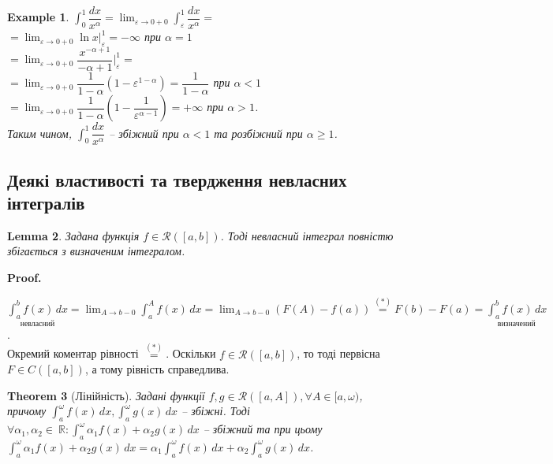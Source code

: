 \documentclass[a4paper, 10pt]{article}
\makeatletter
\def\huge{\displaystyle}
\theoremstyle{theoremdd}
\newtheorem{theorem}{Theorem}[subsection]
\theoremstyle{theoremdd}
\theoremstyle{theoremdd}
\theoremstyle{theoremdd}
\theoremstyle{theoremdd}
\newtheorem{example}[theorem]{Example}
\theoremstyle{theoremdd}
\theoremstyle{theoremdd}
\theoremstyle{theoremdd}
\newtheorem{lemma}[theorem]{Lemma}
\theoremstyle{theoremdd}
\renewenvironment{proof}[1][Proof.\\]{\par
\pushQED{\hfill \qed}%
\normalfont \topsep6\p@\@plus6\p@\relax
\trivlist
\item\relax
{\bfseries
#1\@addpunct{.}}\hspace\labelsep\ignorespaces
}{%
\popQED\endtrivlist\@endpefalse
}
\makeatother
\begin{document}
\begin{example}
$\huge\int_0^1 \dfrac{dx}{x^{\alpha}} = \lim_{\varepsilon \to 0+0} \int_\varepsilon^1 \dfrac{dx}{x^{\alpha}} \boxed{=}$\\
$= \huge\lim_{\varepsilon \to 0+0} \ln x \Big|_\varepsilon^1 = -\infty$ при $\alpha = 1$\\
$= \huge\lim_{\varepsilon \to 0+0} \dfrac{x^{-\alpha+1}}{-\alpha+1} \Big|_\varepsilon^1 =$\\
$=\huge\lim_{\varepsilon \to 0+0} \dfrac{1}{1-\alpha} \left( 1 - \varepsilon^{1-\alpha} \right) = \dfrac{1}{1-\alpha}$ при $\alpha < 1$\\
$=\huge\lim_{\varepsilon \to 0+0} \dfrac{1}{1-\alpha} \left( 1 - \dfrac{1}{\varepsilon^{\alpha-1}} \right) = +\infty$ при $\alpha > 1$.\\
Таким чином, $\huge\int_0^1 \dfrac{dx}{x^\alpha}$ -- збіжний при $\alpha < 1$ та розбіжний при $\alpha \geq 1$.
\end{example}

\subsection{Деякі властивості та твердження невласних інтегралів}
\begin{lemma}
Задана функція $f \in \mathcal{R}([a,b])$. Тоді невласний інтеграл повністю збігається з визначеним інтегралом.
\end{lemma}

\begin{proof}
$\underset{\text{невласний}}{\huge\int_a^b f(x)\,dx} = \huge \lim_{A \to b-0} \int_a^A f(x)\,dx = \huge \lim_{A \to b-0} (F(A)-f(a)) \overset{(*)}{=} F(b) - F(a) = \underset{\text{визначений}}{\huge\int_a^b f(x)\,dx}$.\\
Окремий коментар рівності $\overset{(*)}{=}$. Оскільки $f \in \mathcal{R}([a,b])$, то тоді первісна $F \in C([a,b])$, а тому рівність справедлива.
\end{proof}

\begin{theorem}[Лінійність]
Задані функції $f,g \in \mathcal{R}([a,A]), \forall A \in [a,\omega)$, причому $\huge\int_a^\omega f(x)\,dx, \huge\int_a^\omega g(x)\,dx$ -- збіжні. Тоді $\forall \alpha_1,\alpha_2 \in ~{\mathbb{R}}: \huge\int_a^\omega \alpha_1 f(x) + \alpha_2 g(x)\,dx$ -- збіжний та при цьому $\huge\int_a^\omega \alpha_1 f(x) + \alpha_2 g(x)\,dx = \alpha_1 \int_a^\omega f(x)\,dx + \alpha_2 \int_a^\omega g(x)\,dx$.
\end{theorem}
\end{document}
